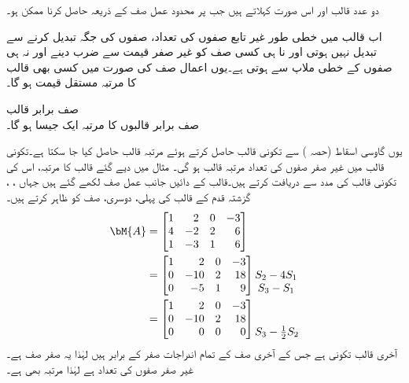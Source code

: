 دو عدد قالب  اور   اس صورت  کہلاتے ہیں جب  پر محدود عمل صف کے ذریعہ  حاصل کرنا ممکن ہو۔

اب قالب میں خطی طور غیر تابع صفوں کی تعداد، صفوں کی جگہ تبدیل کرنے سے  تبدیل نہیں ہوتی اور نا ہی کسی صف کو غیر صفر قیمت  سے ضرب دینے اور نہ ہی صفوں کے خطی ملاپ سے  ہوتی ہے۔یوں اعمال صف کی صورت میں کسی بھی قالب کا مرتبہ مستقل قیمت ہو گا۔

\quad صف برابر قالب\\
صف برابر قالبوں کا مرتبہ ایک جیسا ہو گا۔

یوں گاوسی اسقاط (حصہ ) سے  تکونی قالب حاصل کرتے ہوئے مرتبہ قالب حاصل کیا جا سکتا ہے۔تکونی قالب میں غیر صفر صفوں کی تعداد مرتبہ قالب ہو گی۔  
مثال  میں دیے گئے قالب کا مرتبہ، اس کی تکونی قالب کی مدد سے دریافت کرتے ہیں۔قالب کے دائیں جانب عمل صف لکھے گئے ہیں جہاں ، ،   گزشتہ قدم کے قالب کی پہلی، دوسری،   صف کو ظاہر کرتے ہیں۔
\begin{align*}
\bM{A}&=\begin{bmatrix*}[r] 1&2&0&-3\\4&-2&2&6\\1&-3&1&6 \end{bmatrix*}\\
&=\begin{bmatrix*}[r] 1&2&0&-3\\0&-10&2&18\\0&-5&1&9 \end{bmatrix*}\begin{matrix}\\ S_2-4S_1\\
S_3-S_1 \end{matrix}\\
&=\begin{bmatrix*}[r] 1&2&0&-3\\0&-10&2&18\\0&0&0&0 \end{bmatrix*}\begin{matrix}\\   \\
S_3-\frac{1}{2}S_2 \end{matrix}
\end{align*}
آخری قالب تکونی ہے جس کے آخری صف کے تمام اندراجات صفر کے برابر ہیں لہٰذا یہ صفر صف ہے۔غیر صفر صفوں کی تعداد  ہے لہٰذا  مرتبہ بھی  ہے۔

